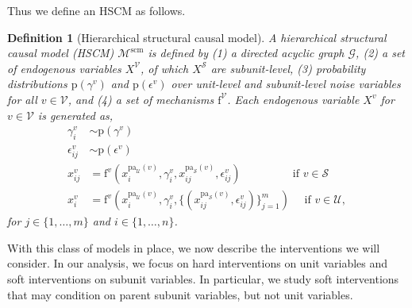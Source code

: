 \documentclass[12pt]{article}
\newtheorem{definition}{Definition}
\newcommand{\pa}{\mathrm{pa}}
\newcommand{\pr}{\mathrm{p}}
\newcommand{\f}{\mathrm{f}}
\newcommand{\scm}{\mathrm{scm}}
\begin{document}
Thus we define an HSCM as follows.


















\begin{definition}[Hierarchical structural causal model] \label{def:hscm} A hierarchical structural causal model (HSCM) $\mathcal{M}^{\scm}$ is defined by (1) a directed acyclic graph $\mathcal{G}$, (2) a set of endogenous variables $X^{\mathcal{V}}$, of which $X^{\mathcal{S}}$ are subunit-level, (3) probability distributions $\pr(\gamma^v)$ and $\pr(\epsilon^v)$ over unit-level and subunit-level noise variables for all $v \in \mathcal{V}$, and (4) a set of mechanisms $\f^{\mathcal{V}}$.  Each endogenous variable $X^v$ for $v \in \mathcal{V}$ is generated as,
\begin{equation} \label{eqn:hscm}
\begin{split}
\gamma_i^v &\sim \pr(\gamma^v)\\
\epsilon_{ij}^v &\sim \pr(\epsilon^v)\\
x^v_{ij} &= \f^v(x^{\pa_\mathcal{U}(v)}_i, \gamma_i^v, x^{\pa_\mathcal{S}(v)}_{ij}, \epsilon^v_{ij}) \,\,\,\,\,\,\,\,\,\,\,\,\,\,\,\,\,\,\,\,\,\,\,\,\,\, \text{ if } v \in \mathcal{S}\\
x^v_i &= \f^v(x^{\pa_\mathcal{U}(v)}_i, \gamma_i^v, \{(x^{\pa_\mathcal{S}(v)}_{ij}, \epsilon^v_{ij})\}_{j=1}^m)  \,\,\,\,\,\, \text{ if } v \in \mathcal{U},
\end{split}
\end{equation}
for $j \in \{1, \ldots, m\}$ and $i \in \{1, \ldots, n\}$.
\end{definition}

With this class of models in place, we now describe the interventions we will consider.  In our analysis, we focus on hard interventions on unit variables and soft interventions on subunit variables.  In particular, we study soft interventions that may condition on parent subunit variables, but not unit variables.
\end{document}
